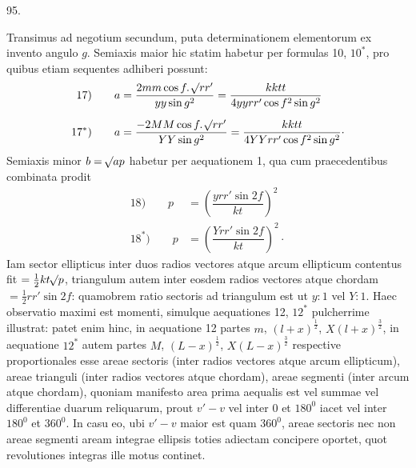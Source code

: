 \par{}\medskip
\hypertarget{native-128-article095}{}
\begin{center}95.\end{center}
Transimus ad negotium secundum, puta determinationem elementorum ex invento angulo $g$. Semiaxis maior hic statim habetur per formulas 10, $10^{\ast}$, pro quibus etiam sequentes adhiberi possunt:
\[
\begin{aligned}
\mathrm{17)}\qquad a&=\dfrac{2mm\cos f\mathpunct{.}\mathord{{}^{}\!\surd}rr'}{yy\sin g^2}=\dfrac{kktt}{4yyrr'\cos f^2\sin g^2}\\[6pt]
\mathrm{17}^{\ast}\mathrm{)}\qquad a&=\dfrac{-2MM\cos f\mathpunct{.}\mathord{{}^{}\!\surd}rr'}{YY\sin g^2}=\dfrac{kktt}{4YYrr'\cos f^2\sin g^2}\mathpunct{\cdot}
\end{aligned}
\]
Semiaxis minor $b=\mathord{{}^{}\!\surd}ap$ habetur per aequationem 1, qua cum praecedentibus combinata prodit
\[
\begin{aligned}
\mathrm{18)}\qquad p&=\left(\dfrac{yrr'\sin 2f}{kt}\right)^2\\[6pt]
\mathrm{18}^{\ast}\mathrm{)}\qquad p&=\left(\dfrac{Yrr'\sin 2f}{kt}\right)^2\mathpunct{\cdot}
\end{aligned}
\]
Iam sector ellipticus inter duos radios vectores atque arcum ellipticum contentus fit $=\frac12 kt\mathord{{}^{}\!\surd}p$, triangulum autem inter eosdem radios vectores atque chordam $=\frac12 rr'\sin 2f$: quamobrem ratio sectoris ad triangulum est ut $y:1$ vel $Y:1$. Haec observatio maximi est momenti, simulque aequationes 12, $12^{\ast}$ pulcherrime illustrat: patet enim hinc, in aequatione 12 partes $m$, $(l+x)^{\frac12}$, $X(l+x)^{\frac32}$, in aequatione $12^{\ast}$ autem partes $M$, $(L-x)^{\frac12}$, $X(L-x)^{\frac32}$ respective proportionales esse areae sectoris (inter radios vectores atque arcum ellipticum), areae trianguli (inter radios vectores atque chordam), areae segmenti (inter arcum atque chordam), quoniam manifesto area prima aequalis est vel summae vel differentiae duarum reliquarum, prout $v'-v$ vel inter 0 et $180^0$ iacet vel inter $180^0$ et $360^0$. In casu eo, ubi $v'-v$ maior est quam $360^0$, areae sectoris nec non areae segmenti aream integrae ellipsis toties adiectam concipere oportet, quot revolutiones integras ille motus continet.

